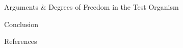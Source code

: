 \documentclass[14pt]{beamer}
\begin{document}
\begin{frame}
\begin{columns}
\begin{column}{.45\textwidth}
\begin{block}{Arguments \& Degrees of Freedom in the Test Organism}
				\end{block}

				\begin{exampleblock}{Conclusion}
					
					
				\end{exampleblock}
				\vspace{1em}
				
				\begin{block}{References}
					
						
				\end{block}
			\end{column}	
		\end{columns}
	\end{frame}	
\centering
\end{document}
